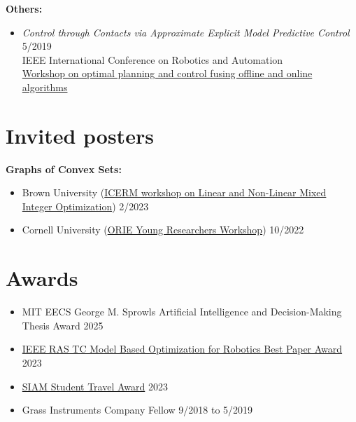 \documentclass[11pt,a4paper,sans]{moderncv}
\begin{document}
\textbf{Others:}

\begin{itemize}

\item \textit{Control through Contacts via Approximate Explicit Model Predictive Control} \hfill 5/2019 \\
IEEE International Conference on Robotics and Automation \\
\href{https://sites.google.com/mit.edu/icra19ws/speakers?authuser=0}{\color{cyan}Workshop  on optimal planning and control fusing offline and online algorithms}

\end{itemize}

\section{Invited posters}

\textbf{Graphs of Convex Sets:}

\begin{itemize}

\item
Brown University
(\href{https://icerm.brown.edu/programs/sp-s23/w1/}{\color{cyan}ICERM workshop on Linear and Non-Linear Mixed Integer Optimization})
\hfill 2/2023

\item
Cornell University
(\href{https://www.orie.cornell.edu/orie-events/young-researchers-workshop}{\color{cyan}ORIE Young Researchers Workshop})
\hfill 10/2022

\end{itemize}

\section{Awards}


\begin{itemize}
\item 
MIT EECS George M. Sprowls Artificial Intelligence and Decision-Making Thesis Award \hfill 2025
\item \href{https://www.tcoptrob.org/news/2024-06-12-best-paper/}{\color{cyan}IEEE RAS TC Model Based Optimization for Robotics Best Paper Award} \hfill 2023
\item  \href{https://www.siam.org/conferences/conference-support/siam-student-travel-awards}{\color{cyan}SIAM Student Travel Award} \hfill 2023
\item Grass Instruments Company Fellow \hfill 9/2018 to 5/2019
\end{itemize}
\end{document}

